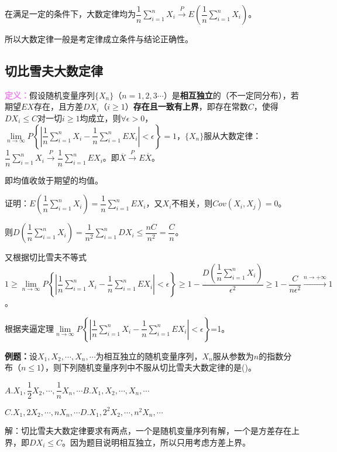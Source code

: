 在满足一定的条件下，大数定律均为$\dfrac{1}{n}\sum\limits_{i=1}^nX_i\overset{P}{\rightarrow}E\left(\dfrac{1}{n}\sum\limits_{i=1}^nX_i\right)$。

所以大数定律一般是考定律成立条件与结论正确性。

\subsection{切比雪夫大数定律}

\textcolor{violet}{\textbf{定义：}}假设随机变量序列$\{X_n\}$（$n=1,2,3\cdots$）是\textbf{相互独立}的（不一定同分布），若期望$EX$存在，且方差$DX_i$（$i\geqslant1$）\textbf{存在且一致有上界}，即存在常数$C$，使得$DX_i\leqslant C$对一切$i\geqslant1$均成立，则$\forall\epsilon>0$，$\lim\limits_{n\to\infty}P\left\{\left\vert\dfrac{1}{n}\sum\limits_{i=1}^nX_i-\dfrac{1}{n}\sum\limits_{i=1}^nEX_i\right\vert<\epsilon\right\}=1$，$\{X_n\}$服从大数定律：$\dfrac{1}{n}\sum\limits_{i=1}^nX_i\overset{P}{\longrightarrow}\dfrac{1}{n}\sum\limits_{i=1}^nEX_i$。即$\overline{X}\overset{P}{\rightarrow}E\overline{X}$。

即均值收敛于期望的均值。

证明：$E\left(\dfrac{1}{n}\sum\limits_{i=1}^nX_i\right)=\dfrac{1}{n}\sum\limits_{i=1}^nEX_i$，又$X_i$不相关，则$Cov(X_i,X_j)=0$。

则$D\left(\dfrac{1}{n}\sum\limits_{i=1}^nX_i\right)=\dfrac{1}{n^2}\sum\limits_{i=1}^nDX_i\leqslant\dfrac{nC}{n^2}=\dfrac{C}{n}$。

又根据切比雪夫不等式$1\geqslant\lim\limits_{n\to\infty}P\left\{\left\vert\dfrac{1}{n}\sum\limits_{i=1}^nX_i-\dfrac{1}{n}\sum\limits_{i=1}^nEX_i\right\vert<\epsilon\right\}\geqslant1-\dfrac{D\left(\dfrac{1}{n}\sum_{i=1}^nX_i\right)}{\epsilon^2}\geqslant1-\dfrac{C}{n\epsilon^2}\xrightarrow{n\to+\infty}1$。

根据夹逼定理$\lim\limits_{n\to\infty}P\left\{\left\vert\dfrac{1}{n}\sum\limits_{i=1}^nX_i-\dfrac{1}{n}\sum\limits_{i=1}^nEX_i\right\vert<\epsilon\right\}$=1。

\textbf{例题：}设$X_1,X_2,\cdots,X_n,\cdots$为相互独立的随机变量序列，$X_n$服从参数为$n$的指数分布（$n\leqslant1$），则下列随机变量序列中不服从切比雪夫大数定律的是()。

$A.X_1,\dfrac{1}{2}X_2,\cdots,\dfrac{1}{n}X_n,\cdots$\qquad$B.X_1,X_2,\cdots,X_n,\cdots$

$C.X_1,2X_2,\cdots,nX_n,\cdots$\qquad$D.X_1,2^2X_2,\cdots,n^2X_n,\cdots$

解：切比雪夫大数定律要求有两点，一个是随机变量序列有解，一个是方差存在上界，即$DX_i\leqslant C$。因为题目说明相互独立，所以只用考虑方差上界。

